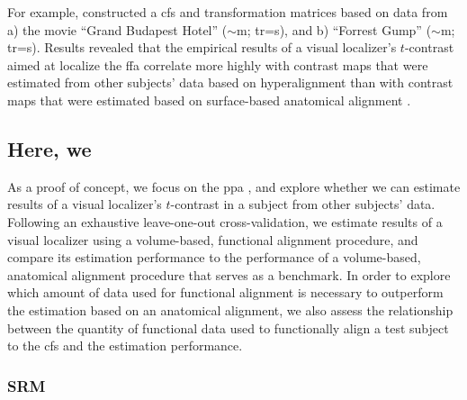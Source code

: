 For example, \citep{jiahui2020predicting} constructed a \ac{cfs} and
transformation matrices based on data from a) the movie ``Grand Budapest Hotel''
($\sim$\unit[50]{m}; \ac{tr}=\unit[1]{s}), and b) ``Forrest Gump''
($\sim$\unit[120]{m}; \ac{tr}=\unit[2]{s}).
Results revealed that the empirical results of a visual localizer's $t$-contrast
aimed at localize the \ac{ffa} correlate more highly with contrast maps that
were estimated from other subjects' data based on hyperalignment than with
contrast maps that were estimated based on surface-based anatomical alignment
\citep{jiahui2020predicting}.


\subsection{Here, we}




As a proof of concept, we focus on the \ac{ppa} \citep[e.g.,][for
reviews]{epstein2014neural, aminoff2013role}, and explore whether we can
estimate results of a visual localizer's $t$-contrast in a subject from other
subjects' data.
%
Following an exhaustive leave-one-out cross-validation, we estimate results of a
visual localizer using a volume-based, functional alignment procedure, and
compare its estimation performance to the performance of a volume-based,
anatomical alignment procedure that serves as a benchmark.
In order to explore which amount of data used for functional alignment is
necessary to outperform the estimation based on an anatomical alignment, we also
assess the relationship between the quantity of functional data used to
functionally align a test subject to the \ac{cfs} and the estimation
performance.


\subsubsection{SRM}


